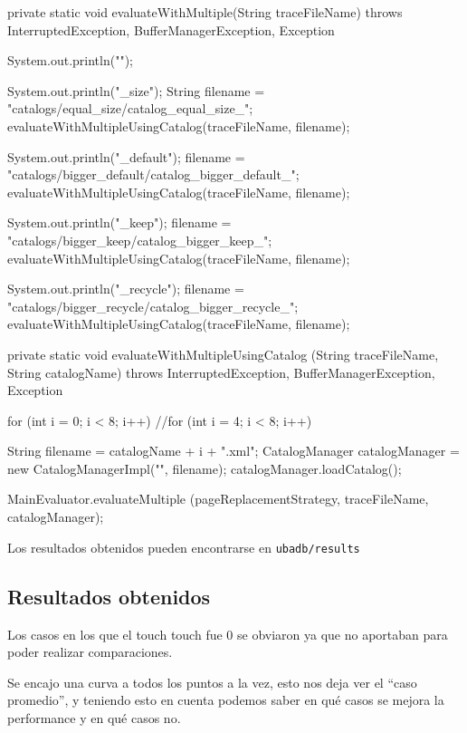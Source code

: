 \newpage
\begin{verbatimtab}[4]
private static void evaluateWithMultiple(String traceFileName) 
	throws InterruptedException, BufferManagerException, Exception
{	
	System.out.println("\nMultipleBufferPool");
		
	System.out.println("\nequal_size\n");
	String filename = "catalogs/equal_size/catalog_equal_size_";
	evaluateWithMultipleUsingCatalog(traceFileName, filename);
		
	System.out.println("\nbigger_default\n");
	filename = "catalogs/bigger_default/catalog_bigger_default_";
	evaluateWithMultipleUsingCatalog(traceFileName, filename);
		
	System.out.println("\nbigger_keep\n");
	filename = "catalogs/bigger_keep/catalog_bigger_keep_";
	evaluateWithMultipleUsingCatalog(traceFileName, filename);
		
	System.out.println("\nbigger_recycle\n");
	filename = "catalogs/bigger_recycle/catalog_bigger_recycle_";
	evaluateWithMultipleUsingCatalog(traceFileName, filename);
}
	
private static void evaluateWithMultipleUsingCatalog
	(String traceFileName, String catalogName) 
	throws InterruptedException, BufferManagerException, Exception
{
	for (int i = 0; i < 8; i++)
	//for (int i = 4; i < 8; i++)
	{
		String filename = catalogName + i + ".xml";
		CatalogManager catalogManager = new CatalogManagerImpl("", filename);
		catalogManager.loadCatalog();

		MainEvaluator.evaluateMultiple
			(pageReplacementStrategy, traceFileName, catalogManager);
		}
	}
\end{verbatimtab}


Los resultados obtenidos pueden encontrarse en \texttt{ubadb/results}


\subsection{Resultados obtenidos}

Los casos en los que el touch touch fue 0 se obviaron ya que no 
aportaban para poder realizar comparaciones.

Se encajo una curva a todos los puntos a la vez, esto nos deja ver
el ``caso promedio'', y teniendo esto en cuenta podemos saber en 
qué casos se mejora la performance y en qué casos no.

